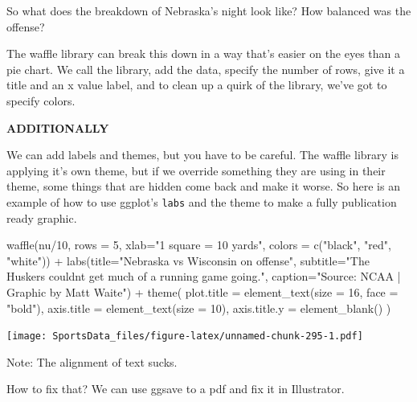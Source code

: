 \documentclass[
]{book}
\newenvironment{Shaded}{\begin{snugshade}}{\end{snugshade}}
\newcommand{\AttributeTok}[1]{\textcolor[rgb]{0.77,0.63,0.00}{#1}}
\newcommand{\DecValTok}[1]{\textcolor[rgb]{0.00,0.00,0.81}{#1}}
\newcommand{\FunctionTok}[1]{\textcolor[rgb]{0.00,0.00,0.00}{#1}}
\newcommand{\NormalTok}[1]{#1}
\newcommand{\SpecialCharTok}[1]{\textcolor[rgb]{0.00,0.00,0.00}{#1}}
\newcommand{\StringTok}[1]{\textcolor[rgb]{0.31,0.60,0.02}{#1}}
\begin{document}
So what does the breakdown of Nebraska's night look like? How balanced was the offense?

The waffle library can break this down in a way that's easier on the eyes than a pie chart. We call the library, add the data, specify the number of rows, give it a title and an x value label, and to clean up a quirk of the library, we've got to specify colors.

\textbf{ADDITIONALLY}

We can add labels and themes, but you have to be careful. The waffle library is applying it's own theme, but if we override something they are using in their theme, some things that are hidden come back and make it worse. So here is an example of how to use ggplot's \texttt{labs} and the theme to make a fully publication ready graphic.

\begin{Shaded}
\begin{Highlighting}[]
\FunctionTok{waffle}\NormalTok{(nu}\SpecialCharTok{/}\DecValTok{10}\NormalTok{, }\AttributeTok{rows =} \DecValTok{5}\NormalTok{, }\AttributeTok{xlab=}\StringTok{"1 square = 10 yards"}\NormalTok{, }\AttributeTok{colors =} \FunctionTok{c}\NormalTok{(}\StringTok{"black"}\NormalTok{, }\StringTok{"red"}\NormalTok{, }\StringTok{"white"}\NormalTok{)) }\SpecialCharTok{+} \FunctionTok{labs}\NormalTok{(}\AttributeTok{title=}\StringTok{"Nebraska vs Wisconsin on offense"}\NormalTok{, }\AttributeTok{subtitle=}\StringTok{"The Huskers couldn\textquotesingle{}t get much of a running game going."}\NormalTok{, }\AttributeTok{caption=}\StringTok{"Source: NCAA | Graphic by Matt Waite"}\NormalTok{) }\SpecialCharTok{+} 
  \FunctionTok{theme}\NormalTok{(}
    \AttributeTok{plot.title =} \FunctionTok{element\_text}\NormalTok{(}\AttributeTok{size =} \DecValTok{16}\NormalTok{, }\AttributeTok{face =} \StringTok{"bold"}\NormalTok{),}
    \AttributeTok{axis.title =} \FunctionTok{element\_text}\NormalTok{(}\AttributeTok{size =} \DecValTok{10}\NormalTok{),}
    \AttributeTok{axis.title.y =} \FunctionTok{element\_blank}\NormalTok{()}
\NormalTok{  )}
\end{Highlighting}
\end{Shaded}

\texttt{[image: SportsData\_files/figure-latex/unnamed-chunk-295-1.pdf]}

Note: The alignment of text sucks.

How to fix that? We can use ggsave to a pdf and fix it in Illustrator.
\end{document}

